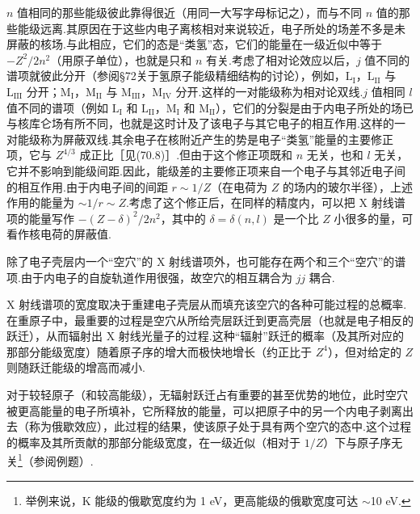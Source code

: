 $n$ 值相同的那些能级彼此靠得很近（用同一大写字母标记之），而与不同 $n$ 值的那些能级远离.其原因在于这些内电子离核相对来说较近，电子所处的场差不多是未屏蔽的核场.与此相应，它们的态是“类氢”态，它们的能量在一级近似中等于 $-Z^{2}/2n^{2}$（用原子单位），也就是只和 $n$ 有关.考虑了相对论效应以后，$j$ 值不同的谱项就彼此分开（参阅§72关于氢原子能级精细结构的讨论），例如，$\mathrm{L}_{\mathrm{I}}$，$\mathrm{L}_{\mathrm{II}}$ 与 $\mathrm{L}_{\mathrm{III}}$ 分开；$\mathrm{M}_{\mathrm{I}}$，$\mathrm{M}_{\mathrm{II}}$ 与 $\mathrm{M}_{\mathrm{III}}$，$\mathrm{M}_{\mathrm{IV}}$ 分开.这样的一对能级称为相对论双线.$j$ 值相同 $l$ 值不同的谱项（例如 $\mathrm{L}_{\mathrm{I}}$ 和 $\mathrm{L}_{\mathrm{II}}$，$\mathrm{M}_{\mathrm{I}}$ 和 $\mathrm{M}_{\mathrm{II}}$），它们的分裂是由于内电子所处的场已与核库仑场有所不同，也就是这时计及了该电子与其它电子的相互作用.这样的一对能级称为屏蔽双线.其余电子在核附近产生的势是电子“类氢”能量的主要修正项，它与 $Z^{4/3}$ 成正比［见(70.8)］.但由于这个修正项既和 $n$ 无关，也和 $l$ 无关，它并不影响到能级间距.因此，能级差的主要修正项来自一个电子与其邻近电子间的相互作用.由于内电子间的间距 $r\sim1/Z$（在电荷为 $Z$ 的场内的玻尔半径），上述作用的能量为 $\sim1/r\sim Z$.考虑了这个修正后，在同样的精度内，可以把 X 射线谱项的能量写作 $-(Z-\delta)^{2}/2n^{2}$，其中的 $\delta=\delta(n,l)$ 是一个比 $Z$ 小很多的量，可看作核电荷的屏蔽值.

除了电子壳层内一个“空穴”的 X 射线谱项外，也可能存在两个和三个“空穴”的谱项.由于内电子的自旋轨道作用很强，故空穴的相互耦合为 $jj$ 耦合.

X 射线谱项的宽度取决于重建电子壳层从而填充该空穴的各种可能过程的总概率.在重原子中，最重要的过程是空穴从所给壳层跃迁到更高壳层（也就是电子相反的跃迁），从而辐射出 X 射线光量子的过程.这种“辐射”跃迁的概率（及其所对应的那部分能级宽度）随着原子序的增大而极快地增长（约正比于 $Z^{4}$），但对给定的 $Z$ 则随跃迁能级的增高而减小.

对于较轻原子（和较高能级），无辐射跃迁占有重要的甚至优势的地位，此时空穴被更高能量的电子所填补，它所释放的能量，可以把原子中的另一个内电子剥离出去（称为俄歇效应），此过程的结果，使该原子处于具有两个空穴的态中.这个过程的概率及其所贡献的那部分能级宽度，在一级近似（相对于 $1/Z$）下与原子序无关\footnote{举例来说，K 能级的俄歇宽度约为 1 eV，更高能级的俄歇宽度可达 $\sim$10 eV.}（参阅例题）.

